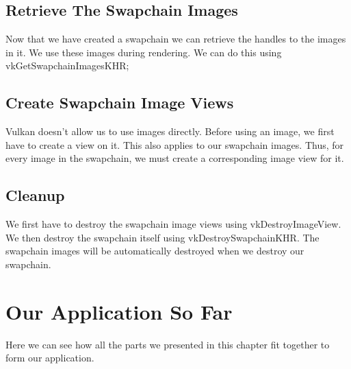\begin{minipage}{\linewidth}{\noindent}
    
\end{minipage}

\subsection{Retrieve The Swapchain Images}

Now that we have created a swapchain we can retrieve the handles to the images
in it.
We use these images during rendering.
We can do this using vkGetSwapchainImagesKHR;

\subsection{Create Swapchain Image Views}

Vulkan doesn't allow us to use images directly.
Before using an image, we first have to create a view on it.
This also applies to our swapchain images.
Thus, for every image in the swapchain, we must create a corresponding
image view for it.

\begin{minipage}{\linewidth}{\noindent}
    
\end{minipage}

\subsection{Cleanup}

We first have to destroy the swapchain image views using vkDestroyImageView.
We then destroy the swapchain itself using vkDestroySwapchainKHR.
The swapchain images will be automatically destroyed when we destroy our
swapchain.

\section{Our Application So Far}

Here we can see how all the parts we presented in this chapter fit together
to form our application.

\begin{minipage}{\linewidth}{\noindent}
    
\end{minipage}
